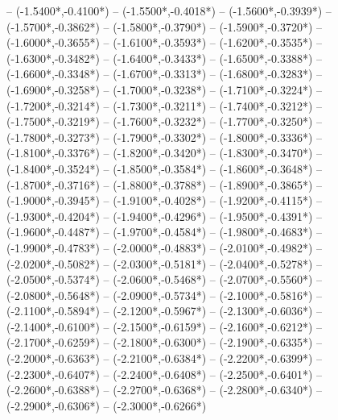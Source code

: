 {	-- ({-1.5400*\dx},{-0.4100*\dy})
	-- ({-1.5500*\dx},{-0.4018*\dy})
	-- ({-1.5600*\dx},{-0.3939*\dy})
	-- ({-1.5700*\dx},{-0.3862*\dy})
	-- ({-1.5800*\dx},{-0.3790*\dy})
	-- ({-1.5900*\dx},{-0.3720*\dy})
	-- ({-1.6000*\dx},{-0.3655*\dy})
	-- ({-1.6100*\dx},{-0.3593*\dy})
	-- ({-1.6200*\dx},{-0.3535*\dy})
	-- ({-1.6300*\dx},{-0.3482*\dy})
	-- ({-1.6400*\dx},{-0.3433*\dy})
	-- ({-1.6500*\dx},{-0.3388*\dy})
	-- ({-1.6600*\dx},{-0.3348*\dy})
	-- ({-1.6700*\dx},{-0.3313*\dy})
	-- ({-1.6800*\dx},{-0.3283*\dy})
	-- ({-1.6900*\dx},{-0.3258*\dy})
	-- ({-1.7000*\dx},{-0.3238*\dy})
	-- ({-1.7100*\dx},{-0.3224*\dy})
	-- ({-1.7200*\dx},{-0.3214*\dy})
	-- ({-1.7300*\dx},{-0.3211*\dy})
	-- ({-1.7400*\dx},{-0.3212*\dy})
	-- ({-1.7500*\dx},{-0.3219*\dy})
	-- ({-1.7600*\dx},{-0.3232*\dy})
	-- ({-1.7700*\dx},{-0.3250*\dy})
	-- ({-1.7800*\dx},{-0.3273*\dy})
	-- ({-1.7900*\dx},{-0.3302*\dy})
	-- ({-1.8000*\dx},{-0.3336*\dy})
	-- ({-1.8100*\dx},{-0.3376*\dy})
	-- ({-1.8200*\dx},{-0.3420*\dy})
	-- ({-1.8300*\dx},{-0.3470*\dy})
	-- ({-1.8400*\dx},{-0.3524*\dy})
	-- ({-1.8500*\dx},{-0.3584*\dy})
	-- ({-1.8600*\dx},{-0.3648*\dy})
	-- ({-1.8700*\dx},{-0.3716*\dy})
	-- ({-1.8800*\dx},{-0.3788*\dy})
	-- ({-1.8900*\dx},{-0.3865*\dy})
	-- ({-1.9000*\dx},{-0.3945*\dy})
	-- ({-1.9100*\dx},{-0.4028*\dy})
	-- ({-1.9200*\dx},{-0.4115*\dy})
	-- ({-1.9300*\dx},{-0.4204*\dy})
	-- ({-1.9400*\dx},{-0.4296*\dy})
	-- ({-1.9500*\dx},{-0.4391*\dy})
	-- ({-1.9600*\dx},{-0.4487*\dy})
	-- ({-1.9700*\dx},{-0.4584*\dy})
	-- ({-1.9800*\dx},{-0.4683*\dy})
	-- ({-1.9900*\dx},{-0.4783*\dy})
	-- ({-2.0000*\dx},{-0.4883*\dy})
	-- ({-2.0100*\dx},{-0.4982*\dy})
	-- ({-2.0200*\dx},{-0.5082*\dy})
	-- ({-2.0300*\dx},{-0.5181*\dy})
	-- ({-2.0400*\dx},{-0.5278*\dy})
	-- ({-2.0500*\dx},{-0.5374*\dy})
	-- ({-2.0600*\dx},{-0.5468*\dy})
	-- ({-2.0700*\dx},{-0.5560*\dy})
	-- ({-2.0800*\dx},{-0.5648*\dy})
	-- ({-2.0900*\dx},{-0.5734*\dy})
	-- ({-2.1000*\dx},{-0.5816*\dy})
	-- ({-2.1100*\dx},{-0.5894*\dy})
	-- ({-2.1200*\dx},{-0.5967*\dy})
	-- ({-2.1300*\dx},{-0.6036*\dy})
	-- ({-2.1400*\dx},{-0.6100*\dy})
	-- ({-2.1500*\dx},{-0.6159*\dy})
	-- ({-2.1600*\dx},{-0.6212*\dy})
	-- ({-2.1700*\dx},{-0.6259*\dy})
	-- ({-2.1800*\dx},{-0.6300*\dy})
	-- ({-2.1900*\dx},{-0.6335*\dy})
	-- ({-2.2000*\dx},{-0.6363*\dy})
	-- ({-2.2100*\dx},{-0.6384*\dy})
	-- ({-2.2200*\dx},{-0.6399*\dy})
	-- ({-2.2300*\dx},{-0.6407*\dy})
	-- ({-2.2400*\dx},{-0.6408*\dy})
	-- ({-2.2500*\dx},{-0.6401*\dy})
	-- ({-2.2600*\dx},{-0.6388*\dy})
	-- ({-2.2700*\dx},{-0.6368*\dy})
	-- ({-2.2800*\dx},{-0.6340*\dy})
	-- ({-2.2900*\dx},{-0.6306*\dy})
	-- ({-2.3000*\dx},{-0.6266*\dy})
}

